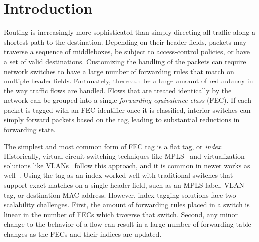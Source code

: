 \section{Introduction}
\label{sec:intro}
Routing is increasingly more sophisticated than simply directing all traffic along a shortest path to the destination.  Depending on their header fields, packets may traverse a sequence of middleboxes, be subject to access-control policies, or have a set of valid destinations.  Customizing the handling of the packets can require network switches to have a large number of forwarding rules that match on multiple header fields.  Fortunately, there can be a large amount of redundancy in the way traffic flows are handled.  Flows that are treated identically by the network can be grouped into a single \emph{forwarding equivalence class} (FEC). If each packet is tagged with an FEC identifier once it is classified, interior switches can simply forward packets based on the tag, leading to substantial reductions in forwarding state.

The simplest and most common form of FEC tag is a flat tag, or \emph{index}. Historically, virtual circuit switching techniques like MPLS~\cite{mpls} and virtualization solutions like VLANs~\cite{vlan} follow this approach, and it is common in newer works as well~\cite{flowtags,sdx}.  Using the tag as an index worked well with traditional switches that support exact matches on a single header field, such as an MPLS label, VLAN tag, or destination MAC address.  However, index tagging solutions face two scalability challenges. First, the amount of forwarding rules placed in a switch is linear in the number of FECs which traverse that switch. Second, any minor change to the behavior of a flow can result in a large number of forwarding table changes as the FECs and their indices are updated.

